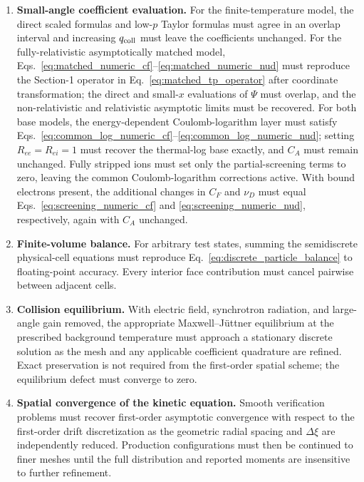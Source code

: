 \documentclass[11pt]{article}
\begin{document}
\begin{enumerate}
 \item \textbf{Small-angle coefficient evaluation.}
       For the finite-temperature model, the direct scaled formulas and low-$p$ Taylor
       formulas must agree in an overlap interval and increasing $q_{\rm coll}$ must
       leave the coefficients unchanged.  For the fully-relativistic asymptotically matched model,
       Eqs.~\eqref{eq:matched_numeric_cf}--\eqref{eq:matched_numeric_nud} must reproduce the
       Section-1 operator in Eq.~\eqref{eq:matched_tp_operator} after coordinate
       transformation; the direct and small-$x$ evaluations of $\Psi$ must overlap, and
       the non-relativistic and relativistic asymptotic limits must be recovered.
       For both base models, the energy-dependent Coulomb-logarithm layer must satisfy
       Eqs.~\eqref{eq:common_log_numeric_cf}--\eqref{eq:common_log_numeric_nud}; setting
       $R_{ee}=R_{ei}=1$ must recover the thermal-log base exactly, and $C_A$ must remain
       unchanged.  Fully stripped ions must set only the partial-screening terms to zero,
       leaving the common Coulomb-logarithm corrections active.  With bound electrons
       present, the additional changes in $C_F$ and $\nu_D$ must equal
       Eqs.~\eqref{eq:screening_numeric_cf} and \eqref{eq:screening_numeric_nud},
       respectively, again with $C_A$ unchanged.

 \item \textbf{Finite-volume balance.}
       For arbitrary test states, summing the semidiscrete physical-cell equations must
       reproduce Eq.~\eqref{eq:discrete_particle_balance} to floating-point accuracy.
       Every interior face contribution must cancel pairwise between adjacent cells.

 \item \textbf{Collision equilibrium.}
       With electric field, synchrotron radiation, and large-angle gain removed, the
       appropriate Maxwell--J{\"u}ttner equilibrium at the prescribed background
       temperature must approach a stationary discrete solution as the mesh and
       any applicable coefficient quadrature are refined.  Exact preservation is not
       required from the first-order spatial scheme; the equilibrium defect must converge
       to zero.

 \item \textbf{Spatial convergence of the kinetic equation.}
       Smooth verification problems must recover first-order asymptotic convergence with
       respect to the first-order drift discretization as the geometric radial spacing
       and $\Delta\xi$ are independently reduced.  Production configurations must then
       be continued to finer meshes until
       the full distribution and reported moments are insensitive to further refinement.


\end{enumerate}
\end{document}
